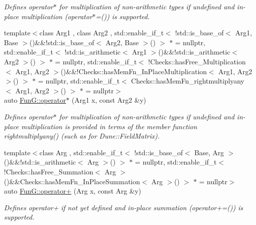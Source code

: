 \begin{DoxyCompactItemize}
\begin{DoxyCompactList}\small\item\em Defines operator$\ast$ for multiplication of non-\/arithmetic types if undefined and in-\/place multiplication (operator$\ast$=()) is supported. \end{DoxyCompactList}\item 
{\footnotesize template$<$class Arg1 , class Arg2 , std\+::enable\+\_\+if\+\_\+t$<$ !std\+::is\+\_\+base\+\_\+of$<$ Arg1, Base $>$()\&\&!std\+::is\+\_\+base\+\_\+of$<$ Arg2, Base $>$() $>$ $\ast$  = nullptr, std\+::enable\+\_\+if\+\_\+t$<$ !std\+::is\+\_\+arithmetic$<$ Arg1 $>$()\&\&!std\+::is\+\_\+arithmetic$<$ Arg2 $>$() $>$ $\ast$  = nullptr, std\+::enable\+\_\+if\+\_\+t$<$ !\+Checks\+::has\+Free\+\_\+\+Multiplication$<$ Arg1, Arg2 $>$()\&\&!\+Checks\+::has\+Mem\+Fn\+\_\+\+In\+Place\+Multiplication$<$ Arg1, Arg2 $>$() $>$ $\ast$  = nullptr, std\+::enable\+\_\+if\+\_\+t$<$ Checks\+::has\+Mem\+Fn\+\_\+rightmultiplyany$<$ Arg1, Arg2 $>$() $>$ $\ast$  = nullptr$>$ }\\auto \hyperlink{namespaceFunG_a6e4d3266e119cd102800bf5c091e57fd}{Fun\+G\+::operator$\ast$} (Arg1 x, const Arg2 \&y)
\begin{DoxyCompactList}\small\item\em Defines operator$\ast$ for multiplication of non-\/arithmetic types if undefined and in-\/place multiplication is provided in terms of the member function rightmultiplyany() (such as for Dune\+::\+Field\+Matrix). \end{DoxyCompactList}\item 
{\footnotesize template$<$class Arg , std\+::enable\+\_\+if\+\_\+t$<$ !std\+::is\+\_\+base\+\_\+of$<$ Base, Arg $>$()\&\&!std\+::is\+\_\+arithmetic$<$ Arg $>$() $>$ $\ast$  = nullptr, std\+::enable\+\_\+if\+\_\+t$<$ !\+Checks\+::has\+Free\+\_\+\+Summation$<$ Arg $>$()\&\&\+Checks\+::has\+Mem\+Fn\+\_\+\+In\+Place\+Summation$<$ Arg $>$() $>$ $\ast$  = nullptr$>$ }\\auto \hyperlink{namespaceFunG_a063d3e8c19dbea3ee1396736fecb64e1}{Fun\+G\+::operator+} (Arg x, const Arg \&y)
\begin{DoxyCompactList}\small\item\em Defines operator+ if not yet defined and in-\/place summation (operator+=()) is supported. \end{DoxyCompactList}\end{DoxyCompactItemize}
